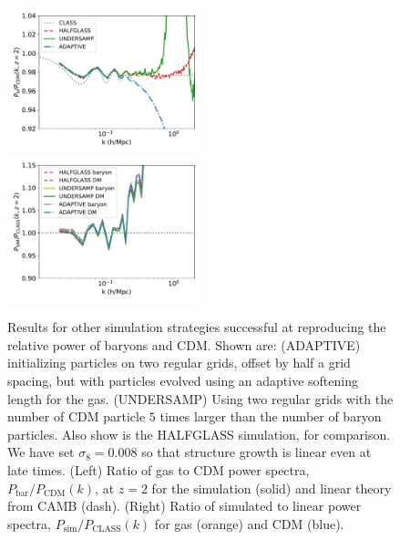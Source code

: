 \documentclass[a4paper,11pt]{article}
\begin{document}
\begin{figure}
\includegraphics[width=0.5\textwidth]{plots/oversample_2_relpower.pdf}
  \includegraphics[width=0.5\textwidth]{plots/oversample_2_class.pdf}
\caption{Results for other simulation strategies successful at reproducing the relative power of baryons and CDM. Shown are: (ADAPTIVE) initializing particles on two regular grids, offset by half a grid spacing, but with particles evolved using an adaptive softening length for the gas. (UNDERSAMP) Using two regular grids with the number of CDM particle $5$ times larger than the number of baryon particles. Also show is the HALFGLASS simulation, for comparison. We have set $\sigma_8 = 0.008$ so that structure growth is linear even at late times. (Left) Ratio of gas to CDM power spectra, $P_\mathrm{bar}/P_\mathrm{CDM}(k)$, at $z=2$ for the simulation (solid) and linear theory from CAMB (dash). (Right) Ratio of simulated to linear power spectra, $P_\mathrm{sim}/P_\mathrm{CLASS}(k)$ for gas (orange) and CDM (blue).}
  \label{fig:adaptive}
\end{figure}
\end{document}
